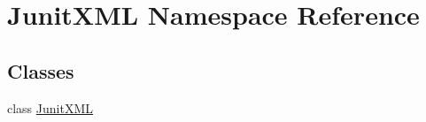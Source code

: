 \hypertarget{namespace_junit_x_m_l}{\section{Junit\-X\-M\-L Namespace Reference}
\label{namespace_junit_x_m_l}
}
\subsection*{Classes}
\begin{DoxyCompactItemize}
\item 
class \hyperlink{class_junit_x_m_l_1_1_junit_x_m_l}{Junit\-X\-M\-L}
\end{DoxyCompactItemize}
